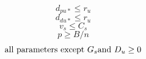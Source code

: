 \documentclass[times, 10pt,twocolumn]{article}
\begin{document}
\begin{equation}
d_{pu*} \leq r_u
\end{equation}
\begin{equation}
d_{du*} \leq r_u
\end{equation}
\begin{equation}
v_s \leq C_s
\end{equation}
\begin{equation}
p \geq B/n
\end{equation}
\begin{equation}
\textnormal{all parameters except } G_s \textnormal{and } D_u \geq 0
\end{equation}

%
%
%
%

\end{document}
